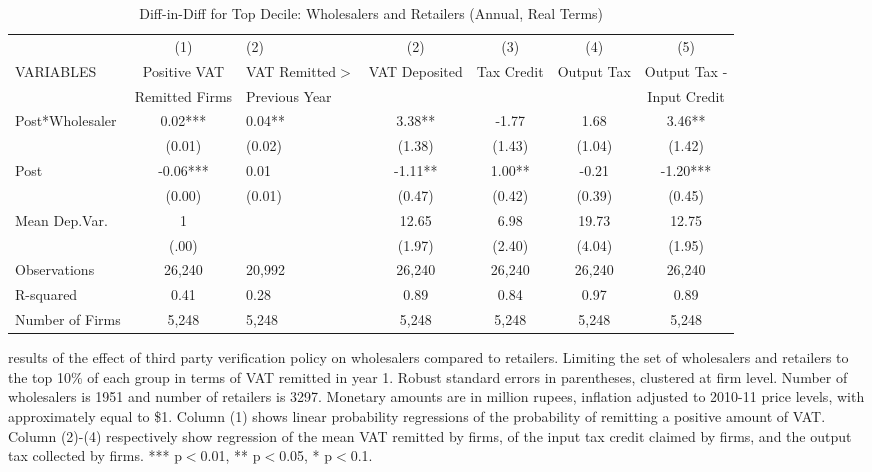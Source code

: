 \begin{table}[t!]
\footnotesize
\begin{threeparttable}
\caption{Diff-in-Diff for Top Decile: Wholesalers and Retailers (Annual, Real Terms)}
\begin{tabular}{lcHcccc} \hline \hline
  & (1) & (2) & (2) & (3) & (4) & (5) \\
 VARIABLES & Positive VAT  & VAT Remitted$>$ & VAT Deposited & Tax Credit & Output Tax & Output Tax -\\
 & Remitted Firms & Previous Year &  &  & & Input Credit \\ \hline
 Post*Wholesaler & 0.02*** & 0.04** & 3.38** & -1.77 & 1.68 & 3.46** \\
 & (0.01) & (0.02) & (1.38) & (1.43) & (1.04) & (1.42) \\
Post & -0.06*** & 0.01 & -1.11** & 1.00** & -0.21 & -1.20*** \\
 & (0.00) & (0.01) & (0.47) & (0.42) & (0.39) & (0.45) \\ \hline
Mean Dep.Var. &1 & & 12.65 & 6.98 & 19.73& 12.75  \\
&(.00)&&(1.97)&(2.40)& (4.04)&(1.95) \\ \hline
Observations & 26,240 & 20,992 & 26,240 & 26,240 & 26,240 & 26,240 \\
R-squared & 0.41 & 0.28 & 0.89 & 0.84 & 0.97 & 0.89 \\
Number of Firms & 5,248 & 5,248 & 5,248 & 5,248 & 5,248 & 5,248 \\ \hline \hline
\end{tabular}
\begin{tablenotes}
 results of the effect of third party verification policy on wholesalers compared to retailers. Limiting the set of wholesalers and retailers to the top 10\% of each group in terms of VAT remitted in year 1. Robust standard errors in parentheses, clustered at firm level. Number of wholesalers is 1951 and number of retailers is 3297. Monetary amounts are in million rupees, inflation adjusted to 2010-11 price levels, with  approximately equal to \$1. Column (1) shows linear probability regressions of the probability of remitting a positive amount of VAT. Column (2)-(4) respectively show regression of the mean VAT remitted by firms, of the input tax credit claimed by firms, and the output tax collected by firms. *** p$<$0.01, ** p$<$0.05, * p$<$0.1.
\end{tablenotes}
\label{tbl:group1-decile}
\end{threeparttable}
\end{table}

